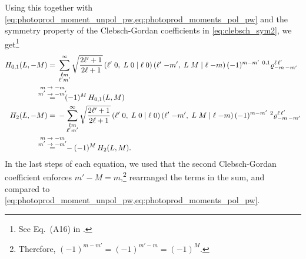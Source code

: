 Using this together with
\cref{eq:photoprod_moment_unpol_pw,eq:photoprod_moments_pol_pw} and the
symmetry property of the Clebsch-Gordan coefficients in
\cref{eq:clebsch_sym2}, we get\footnote{See Eq.~(A16) in
.}
\begin{align}
  H_{0, 1}(L, -M)
  ={}& \sum_{\substack{\ell m \\ \ell' m'}}^\infty
  \sqrt{\frac{2 \ell' + 1}{2 \ell + 1}}\,
  \clebsch{\ell'}{0}{L}{0}{\ell}{0}\, \clebsch{\ell'}{-m'}{L}{M}{\ell}{-m}\,
  (-1)^{m - m'}\, \prescript{0, 1}{}{\varrho}^{\ell\, \ell'}_{{-m}\, {-m}'} \notag
  \\
  \label{eq:photoprod_moments_01_sym_2}
  \equalUsing{$\mathclap{\substack{\displaystyle{m \to -m} \\ \displaystyle{m' \to -m'}}}$}{}& \quad
  (-1)^M\, H_{0, 1}(L, M)
  \\
  H_2(L, -M)
  ={}& -\sum_{\substack{\ell m \\ \ell' m'}}^\infty
  \sqrt{\frac{2 \ell' + 1}{2 \ell + 1}}\,
  \clebsch{\ell'}{0}{L}{0}{\ell}{0}\, \clebsch{\ell'}{-m'}{L}{M}{\ell}{-m}\,
  (-1)^{m - m'}\, \prescript{2}{}{\varrho}^{\ell\, \ell'}_{{-m}\, {-m}'} \notag
  \\
  \label{eq:photoprod_moment_2_sym_2}
  \equalUsing{$\mathclap{\substack{\displaystyle{m \to -m} \\ \displaystyle{m' \to -m'}}}$}{}& \quad
  -(-1)^M\, H_2(L, M).
\end{align}
In the last steps of each equation, we used that the second
Clebsch-Gordan coefficient enforces $m' - M = m$,\footnote{Therefore,
$(-1)^{m - m'} = (-1)^{m' - m} = (-1)^M$.} rearranged the terms in the
sum, and compared to
\cref{eq:photoprod_moment_unpol_pw,eq:photoprod_moments_pol_pw}.

